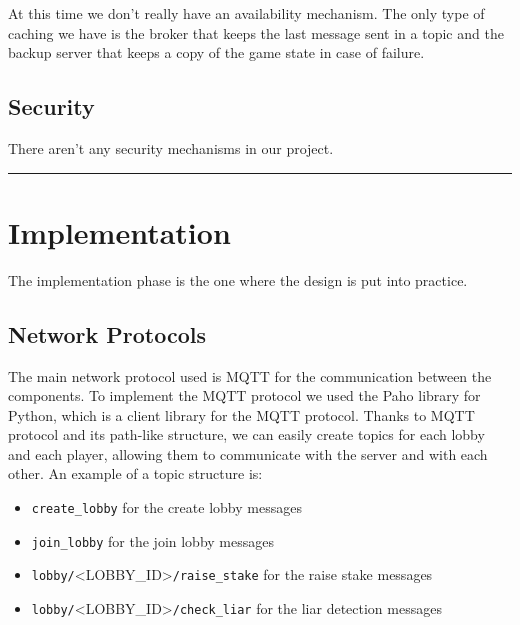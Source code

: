 \documentclass{scrartcl}
\begin{document}
At this time we don't really have an availability mechanism. \newline
The only type of caching we have is the broker that keeps the last message sent in a topic
and the backup server that keeps a copy of the game state in case of failure.

\subsection{Security}\label{security}

There aren't any security mechanisms in our project. \newline


\begin{center}\rule{0.5\linewidth}{0.5pt}\end{center}

\section{Implementation}\label{implementation}

The implementation phase is the one where the design is put into practice.
\subsection{Network Protocols}\label{network-protocols}
The main network protocol used is MQTT for the communication between the components.
To implement the MQTT protocol we used the Paho library for Python, which is a client library for the MQTT protocol. \newline
Thanks to MQTT protocol and its path-like structure, we can easily create topics for each lobby and each player, allowing them to communicate with the server and with each other. \newline
An example of a topic structure is:
\begin{itemize}
      \item \texttt{create\_lobby} for the create lobby messages
      \item \texttt{join\_lobby} for the join lobby messages
      \item \texttt{lobby/}\textless LOBBY\_ID\textgreater\texttt{/raise\_stake} for the raise stake messages
      \item \texttt{lobby/}\textless LOBBY\_ID\textgreater\texttt{/check\_liar} for the liar detection messages
\end{itemize}
\end{document}
